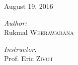 \begin{titlepage}
\begin{center}
{\large August 19, 2016} %



\vspace{\fill}


\begin{minipage}{0.4\textwidth}
\begin{flushleft} \large
\emph{Author:}\\
\Large
Rukmal \textsc{Weerawarana}
\end{flushleft}
\end{minipage}
\hfill
\begin{minipage}{0.4\textwidth}
\begin{flushright} \large
\emph{Instructor:} \\
\Large
Prof. Eric \textsc{Zivot}
\end{flushright}
\end{minipage}

\end{center}
\end{titlepage}
